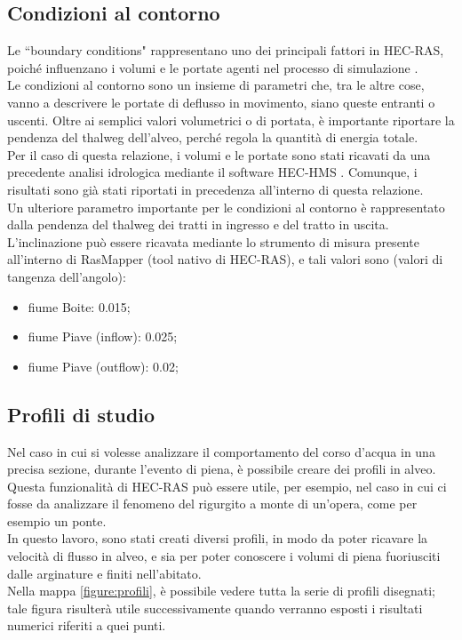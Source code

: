 \subsection{Condizioni al contorno}
Le ``boundary conditions" rappresentano uno dei principali fattori in HEC-RAS, poiché influenzano i volumi e le portate agenti nel processo di simulazione \cite{boundary_conditions}.\\
Le condizioni al contorno sono un insieme di parametri che, tra le altre cose, vanno a descrivere le portate di deflusso in movimento, siano queste entranti o uscenti. Oltre ai semplici valori volumetrici o di portata, è importante riportare la pendenza del thalweg dell'alveo, perché regola la quantità di energia totale.\\
Per il caso di questa relazione, i volumi e le portate sono stati ricavati da una precedente analisi idrologica mediante il software HEC-HMS \cite{progetto_hms}. Comunque, i risultati sono già stati riportati in precedenza all'interno di questa relazione.\\
Un ulteriore parametro importante per le condizioni al contorno è rappresentato dalla pendenza del thalweg dei tratti in ingresso e del tratto in uscita.\\
L'inclinazione può essere ricavata mediante lo strumento di misura presente all'interno di RasMapper (tool nativo di HEC-RAS), e tali valori sono (valori di tangenza dell'angolo):
\begin{itemize}
    \item fiume Boite: 0.015;
    \item fiume Piave (inflow): 0.025;
    \item fiume Piave (outflow): 0.02;
\end{itemize}

\subsection{Profili di studio}
Nel caso in cui si volesse analizzare il comportamento del corso d'acqua in una precisa sezione, durante l'evento di piena, è possibile creare dei profili in alveo. Questa funzionalità di HEC-RAS può essere utile, per esempio, nel caso in cui ci fosse da analizzare il fenomeno del rigurgito a monte di un'opera, come per esempio un ponte.\\
In questo lavoro, sono stati creati diversi profili, in modo da poter ricavare la velocità di flusso in alveo, e sia per poter conoscere i volumi di piena fuoriusciti dalle arginature e finiti nell'abitato.\\
Nella mappa \eqref{figure:profili}, è possibile vedere tutta la serie di profili disegnati; tale figura risulterà utile successivamente quando verranno esposti i risultati numerici riferiti a quei punti.

